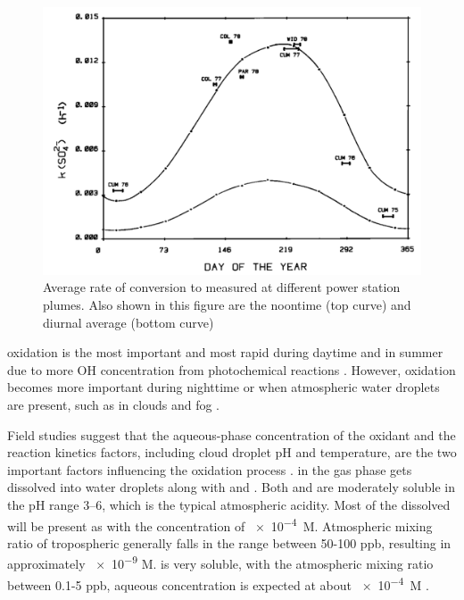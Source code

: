 \begin{figure}
    \centering
    \includegraphics[width=0.8\linewidth]{Chapter4/Figs/meagher1983.png}
    \caption{Average rate of  conversion to  measured at different power station plumes. Also shown in this figure are the noontime (top curve) and diurnal average (bottom curve) \cite{meagherSeasonalVariationAtmospheric1983}}
    \label{fig:ch4:meagher1983}
\end{figure}


 oxidation is the most important and most rapid during daytime and in summer due to more OH concentration from photochemical reactions \citet{eatoughConversionSO2Sulfate1994}. However,  oxidation becomes more important during nighttime or when atmospheric water droplets are present, such as in clouds and fog \cite[e.g. ][]{eatoughConversionSO2Sulfate1994} . 


Field studies suggest that the aqueous-phase concentration of the oxidant and the reaction kinetics factors, including cloud droplet pH and temperature, are the two important factors influencing the oxidation process \cite{eatoughConversionSO2Sulfate1994}.  in the gas phase gets dissolved into water droplets along with  and . Both  and  are moderately soluble in the pH range 3--6, which is the typical atmospheric acidity. Most of the dissolved  will be present as  with the concentration of \qty{e-4}{M}. Atmospheric mixing ratio of tropospheric  generally falls in the range between 50-100 ppb, resulting in approximately \num[]{e-9} M.  is very soluble, with the atmospheric mixing ratio between 0.1-5 ppb, aqueous concentration is expected at about \qty{e-4}{M} \cite{eatoughConversionSO2Sulfate1994}.


